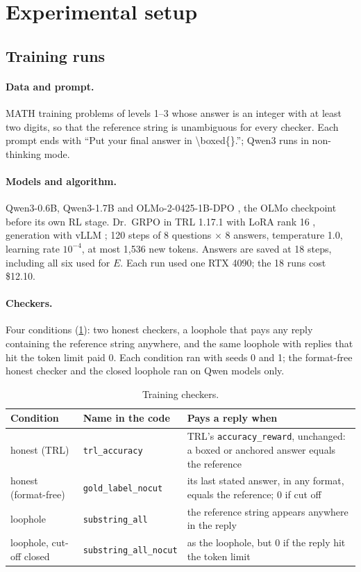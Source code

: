 \documentclass[10pt]{article}
\newcommand{\E}{E}
\begin{document}
\section{Experimental setup}

\subsection{Training runs}
\paragraph{Data and prompt.} MATH training problems \citep{math} of levels 1--3 whose answer is an integer
with at least two digits, so that the reference string is unambiguous for every checker. Each prompt ends
with ``Put your final answer in \textbackslash boxed\{\}.''; Qwen3 runs in non-thinking mode.

\paragraph{Models and algorithm.} Qwen3-0.6B, Qwen3-1.7B \citep{qwen3} and OLMo-2-0425-1B-DPO
\citep{olmo2}, the OLMo checkpoint before its own RL stage. Dr.\ GRPO \citep{drgrpo} in TRL 1.17.1 with
LoRA rank 16 \citep{lora}, generation with vLLM \citep{vllm}; 120 steps of 8 questions $\times$ 8 answers,
temperature 1.0, learning rate $10^{-4}$, at most 1,536 new tokens. Answers are saved at 18 steps,
including all six used for $\E$. Each run used one RTX 4090; the 18 runs cost \$12.10.

\paragraph{Checkers.} Four conditions (\cref{tab:checkers}): two honest checkers, a loophole that pays any
reply containing the reference string anywhere, and the same loophole with replies that hit the token
limit paid 0. Each condition ran with seeds 0 and 1; the format-free honest checker and the closed
loophole ran on Qwen models only.

\begin{table}[t]
\centering\small
\begin{tabularx}{\linewidth}{l l X}
\toprule
Condition & Name in the code & Pays a reply when \\
\midrule
honest (TRL) & \texttt{trl\_accuracy} & TRL's \texttt{accuracy\_reward}, unchanged: a boxed or anchored answer equals the reference \\
honest (format-free) & \texttt{gold\_label\_nocut} & its last stated answer, in any format, equals the reference; 0 if cut off \\
loophole & \texttt{substring\_all} & the reference string appears anywhere in the reply \\
loophole, cut-off closed & \texttt{substring\_all\_nocut} & as the loophole, but 0 if the reply hit the token limit \\
\bottomrule
\end{tabularx}
\caption{Training checkers.}
\label{tab:checkers}
\end{table}
\end{document}
